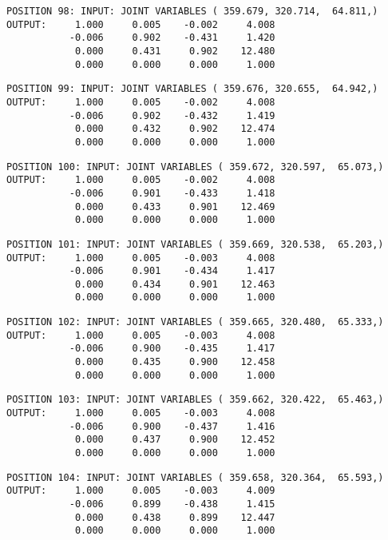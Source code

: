\begin{verbatim}
POSITION 98: INPUT: JOINT VARIABLES ( 359.679, 320.714,  64.811,)
OUTPUT:     1.000     0.005    -0.002     4.008
           -0.006     0.902    -0.431     1.420
            0.000     0.431     0.902    12.480
            0.000     0.000     0.000     1.000
\end{verbatim} \pagebreak[1]\begin{verbatim}
POSITION 99: INPUT: JOINT VARIABLES ( 359.676, 320.655,  64.942,)
OUTPUT:     1.000     0.005    -0.002     4.008
           -0.006     0.902    -0.432     1.419
            0.000     0.432     0.902    12.474
            0.000     0.000     0.000     1.000
\end{verbatim} \pagebreak[1]\begin{verbatim}
POSITION 100: INPUT: JOINT VARIABLES ( 359.672, 320.597,  65.073,)
OUTPUT:     1.000     0.005    -0.002     4.008
           -0.006     0.901    -0.433     1.418
            0.000     0.433     0.901    12.469
            0.000     0.000     0.000     1.000
\end{verbatim} \pagebreak[1]\begin{verbatim}
POSITION 101: INPUT: JOINT VARIABLES ( 359.669, 320.538,  65.203,)
OUTPUT:     1.000     0.005    -0.003     4.008
           -0.006     0.901    -0.434     1.417
            0.000     0.434     0.901    12.463
            0.000     0.000     0.000     1.000
\end{verbatim} \pagebreak[1]\begin{verbatim}
POSITION 102: INPUT: JOINT VARIABLES ( 359.665, 320.480,  65.333,)
OUTPUT:     1.000     0.005    -0.003     4.008
           -0.006     0.900    -0.435     1.417
            0.000     0.435     0.900    12.458
            0.000     0.000     0.000     1.000
\end{verbatim} \pagebreak[1]\begin{verbatim}
POSITION 103: INPUT: JOINT VARIABLES ( 359.662, 320.422,  65.463,)
OUTPUT:     1.000     0.005    -0.003     4.008
           -0.006     0.900    -0.437     1.416
            0.000     0.437     0.900    12.452
            0.000     0.000     0.000     1.000
\end{verbatim} \pagebreak[1]\begin{verbatim}
POSITION 104: INPUT: JOINT VARIABLES ( 359.658, 320.364,  65.593,)
OUTPUT:     1.000     0.005    -0.003     4.009
           -0.006     0.899    -0.438     1.415
            0.000     0.438     0.899    12.447
            0.000     0.000     0.000     1.000
\end{verbatim} \pagebreak[1]\begin{verbatim}

\end{verbatim}

